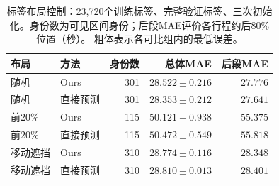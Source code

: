 \begin{table}[t]
\centering\footnotesize\setlength{\tabcolsep}{4pt}
\caption{标签布局控制：23,720个训练标签、完整验证标签、三次初始化。身份数为可见区间身份；后段MAE评价各行程约后80\%位置（秒）。 粗体表示各可比组内的最低误差。}\label{tab:layout}
\begin{tabular}{llrrr}\toprule
布局 & 方法 & 身份数 & 总体MAE & 后段MAE\\\midrule
随机 & Ours & 301 & $28.522\pm0.216$ & $27.776$\\
随机 & 直接预测 & 301 & $\mathbf{28.353\pm0.212}$ & $\mathbf{27.641}$\\
前20\% & Ours & 115 & $\mathbf{50.121\pm0.938}$ & $\mathbf{55.375}$\\
前20\% & 直接预测 & 115 & $50.472\pm0.549$ & $55.818$\\
移动遮挡 & Ours & 310 & $\mathbf{28.774\pm0.116}$ & $\mathbf{28.348}$\\
移动遮挡 & 直接预测 & 310 & $28.810\pm0.013$ & $28.401$\\
\bottomrule\end{tabular}
\end{table}
